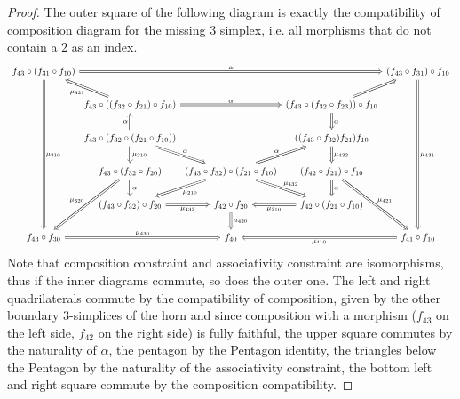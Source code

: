 \begin{proof}
	The outer square of the following diagram is exactly the compatibility of composition diagram for the missing 3 simplex, i.e. all morphisms that do not contain a $ 2 $ as an index.
	\[
	\begin{tikzcd}[column sep=0.7]
		f_{ 4 3 } \circ ( f_{ 3 1 } \circ f_{ 1 0 } )
		\ar[rrrr, Rightarrow, "\alpha"]
		\ar[ddddd, Rightarrow, " \mu_{ 3 1 0 } "]
		&&&&
		( f_{ 4 3 } \circ f_{ 3 1 } ) \circ f_{ 1 0 }
		\ar[ddddd, Rightarrow, " \mu_{ 4 3 1 } "]
		\\
		&
		f_{ 4 3 } \circ ( ( f_{ 3 2 } \circ f_{ 2 1 } ) \circ f_{ 1 0 } )
		\ar[rr, Rightarrow, "\alpha"]
		\ar[lu, Rightarrow,  "\mu_{ 3 2 1 }"]
		&&
		( f_{ 4 3 } \circ ( f_{ 3 2 } \circ f_{ 2 3 } ) ) \circ f_{ 1 0 } 
		\ar[ru, Rightarrow]
		\ar[d, Rightarrow, "\alpha"]
		\\
		&
		f_{ 4 3 } \circ ( f_{ 3 2 } \circ ( f_{ 2 1 } \circ f_{ 1 0 } ) )
		\ar[d, Rightarrow, "\mu_{ 2 1 0 }"]
		\ar[rd, Rightarrow, "\alpha"]
		\ar[u, Rightarrow, "\alpha"]
		&&
		( ( f_{ 4 3 } \circ f_{ 3 2 } ) f_{ 2 1 } ) f_{ 1 0 }
		\ar[d, Rightarrow, "\mu_{ 4 3 2 }"]
		\\
		&
		f_{ 4 3 } \circ ( f_{ 3 2 } \circ f_{ 2 0 } )
		\ar[ddl, Rightarrow, "\mu_{ 3 2 0 }"']
		\ar[d , Rightarrow, " \alpha"]
		&
		( f_{ 4 3 } \circ f_{ 3 2 } ) \circ ( f_{ 2 1 } \circ f_{ 1 0 } )
		\ar[dl, Rightarrow, "\mu_{ 2 1 0 }"]
		\ar[dr, Rightarrow, "\mu_{ 4 3 2 }"]
		\ar[ru, Rightarrow, "\alpha"]
		&
		( f_{ 4 2 } \circ f_{ 2 1 } ) \circ f_{ 1 0 } 
		\ar[d, Rightarrow, "\alpha"]
		\ar[ddr, Rightarrow, " \mu_{ 4 2 1 }"]
		\\
		&
		( f_{ 4 3 } \circ f_{ 3 2 } ) \circ f_{ 2 0 }
		\ar[r, Rightarrow, "\mu_{ 4 3 2 }"']
		&
		f_{ 4 2 } \circ f_{ 2 0 } 
		\ar[d, Rightarrow, " \mu_{ 4 2 0 } "]
		&
		f_{ 4 2 } \circ ( f_{ 2 1 } \circ f_{ 1 0 } )
		\ar[l, Rightarrow, "\mu_{ 2 1 0 }"] 
		\\
		f_{ 4 3 } \circ f_{ 3 0 }
		\ar[rr, Rightarrow, "\mu_{ 4 3 0 } "]
		&&
		f_{ 4 0 }
		&&
		f_{ 4 1 } \circ f_{ 1 0 } 
		\ar[ll, Rightarrow, "\mu_{ 4 1 0 }"]
	\end{tikzcd}
	\]
	Note that composition constraint and associativity constraint are isomorphisms, thus if the inner diagrams commute, so does the outer one.
	The left and right quadrilaterals commute by the compatibility of composition, given by the other boundary 3-simplices of the horn and since composition with a morphism ($ f_{ 4 3 } $ on the left side, $f_{ 4 2 } $ on the right side) is fully faithful, the upper square commutes by the naturality of $ \alpha $, the pentagon by the Pentagon identity, the triangles below the Pentagon by the naturality of the associativity constraint, the bottom left and right square commute by the composition compatibility.
\end{proof}


